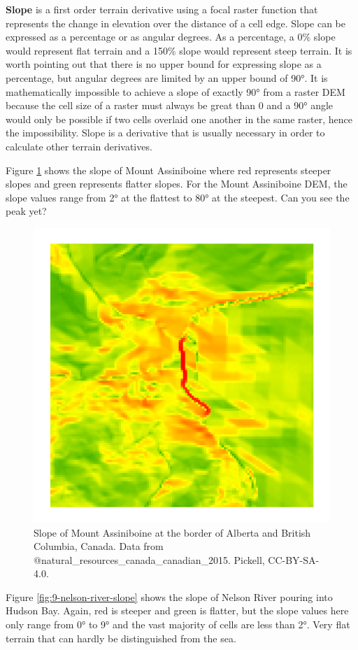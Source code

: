 \documentclass[
]{book}
\begin{document}
\textbf{Slope} is a first order terrain derivative using a focal raster function that represents the change in elevation over the distance of a cell edge. Slope can be expressed as a percentage or as angular degrees. As a percentage, a 0\% slope would represent flat terrain and a 150\% slope would represent steep terrain. It is worth pointing out that there is no upper bound for expressing slope as a percentage, but angular degrees are limited by an upper bound of 90°. It is mathematically impossible to achieve a slope of exactly 90° from a raster DEM because the cell size of a raster must always be great than 0 and a 90° angle would only be possible if two cells overlaid one another in the same raster, hence the impossibility. Slope is a derivative that is usually necessary in order to calculate other terrain derivatives.

Figure \ref{fig:9-mount-assiniboine-slope} shows the slope of Mount Assiniboine where red represents steeper slopes and green represents flatter slopes. For the Mount Assiniboine DEM, the slope values range from 2° at the flattest to 80° at the steepest. Can you see the peak yet?

\begin{figure}
\includegraphics[width=0.75\linewidth]{images/09-mount-assiniboine-slope} \caption{Slope of Mount Assiniboine at the border of Alberta and British Columbia, Canada. Data from @natural_resources_canada_canadian_2015. Pickell, CC-BY-SA-4.0.}\label{fig:9-mount-assiniboine-slope}
\end{figure}

Figure \ref{fig:9-nelson-river-slope} shows the slope of Nelson River pouring into Hudson Bay. Again, red is steeper and green is flatter, but the slope values here only range from 0° to 9° and the vast majority of cells are less than 2°. Very flat terrain that can hardly be distinguished from the sea.
\end{document}
